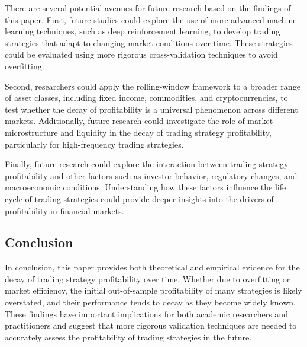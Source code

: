 There are several potential avenues for future research based on the findings of this paper. First, future studies could explore the use of more advanced machine learning techniques, such as deep reinforcement learning, to develop trading strategies that adapt to changing market conditions over time. These strategies could be evaluated using more rigorous cross-validation techniques to avoid overfitting.

Second, researchers could apply the rolling-window framework to a broader range of asset classes, including fixed income, commodities, and cryptocurrencies, to test whether the decay of profitability is a universal phenomenon across different markets. Additionally, future research could investigate the role of market microstructure and liquidity in the decay of trading strategy profitability, particularly for high-frequency trading strategies.

Finally, future research could explore the interaction between trading strategy profitability and other factors such as investor behavior, regulatory changes, and macroeconomic conditions. Understanding how these factors influence the life cycle of trading strategies could provide deeper insights into the drivers of profitability in financial markets.

\subsection{Conclusion}

In conclusion, this paper provides both theoretical and empirical evidence for the decay of trading strategy profitability over time. Whether due to overfitting or market efficiency, the initial out-of-sample profitability of many strategies is likely overstated, and their performance tends to decay as they become widely known. These findings have important implications for both academic researchers and practitioners and suggest that more rigorous validation techniques are needed to accurately assess the profitability of trading strategies in the future.
